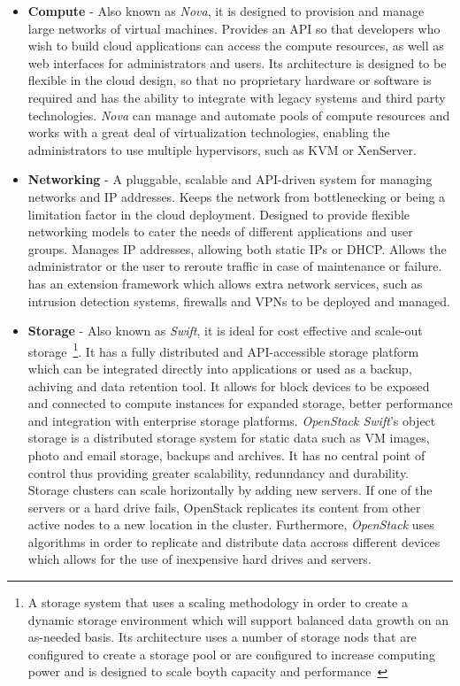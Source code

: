 \begin{itemize}
\item \textbf{Compute} - Also known as \textit{Nova}, it is designed to provision and manage large networks of virtual machines. Provides an API so that developers who wish to build cloud applications can access the compute resources, as well as web interfaces for administrators and users. Its architecture is designed to be flexible in the cloud design, so that no proprietary hardware or software is required and has the ability to integrate with legacy systems and third party technologies. \textit{Nova} can manage and automate pools of compute resources and works with a great deal of virtualization technologies, enabling the administrators to use multiple hypervisors, such as KVM or XenServer.
\item \textbf{Networking} - A pluggable, scalable and API-driven system for managing networks and IP addresses. Keeps the network from bottlenecking or being a limitation factor in the cloud deployment. Designed to provide flexible networking models to cater the needs of different applications and user groups. Manages IP addresses, allowing both static IPs or DHCP. Allows the administrator or the user to reroute traffic in case of maintenance or failure.  has an extension framework which allows extra network services, such as intrusion detection systems, firewalls and VPNs to be deployed and managed.
\item \textbf{Storage} - Also known as \textit{Swift}, it is ideal for cost effective and scale-out storage~\footnote{A storage system that uses a scaling methodology in order to create a dynamic storage environment which will support balanced data growth on an as-needed basis. Its architecture uses a number of storage nods that are configured to create a storage pool or are configured to increase computing power and is designed to scale boyth capacity and performance~\cite{http://www.webopedia.com/TERM/S/scale_out_storage.html}}. It has a fully distributed and API-accessible storage platform which can be integrated directly into applications or used as a backup, achiving and data retention tool. It allows for block devices to be exposed and connected to compute instances for expanded storage, better performance and integration with enterprise storage platforms. \textit{OpenStack Swift}'s object storage is a distributed storage system for static data such as VM images, photo and email storage, backups and archives. It has no central point of control thus providing greater scalability, redunndancy and durability. Storage clusters can scale horizontally by adding new servers. If one of the servers or a hard drive fails, OpenStack replicates its content from other active nodes to a new location in the cluster. Furthermore, \textit{OpenStack} uses algorithms in order to replicate and distribute data accross different devices which allows for the use of inexpensive hard drives and servers.

\end{itemize}
